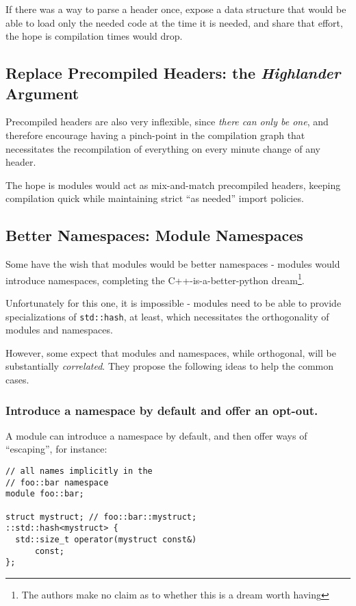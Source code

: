 \documentclass[reqno]{article}
\begin{document}
If there was a way to parse a header once, expose a data structure that would be
able to load only the needed code at the time it is needed, and share that
effort, the hope is compilation times would drop.


\subsection{Replace Precompiled Headers: the \emph{Highlander} Argument}

Precompiled headers are also very inflexible, since \emph{there can only be
one}, and therefore encourage having a pinch-point in the compilation graph that
necessitates the recompilation of everything on every minute change of any
header.

The hope is modules would act as mix-and-match precompiled headers, keeping
compilation quick while maintaining strict “as needed” import policies.


\subsection{Better Namespaces: Module Namespaces}

Some have the wish that modules would be better namespaces - modules would
introduce namespaces, completing the C++-is-a-better-python dream\footnote{The
authors make no claim as to whether this is a dream worth having}.

Unfortunately for this one, it is impossible - modules need to be able to
provide specializations of \texttt{std::hash}, at least, which necessitates the
orthogonality of modules and namespaces.

However, some expect that modules and namespaces, while orthogonal, will be
substantially \emph{correlated}. They propose the following ideas to help the
common cases.


\subsubsection{Introduce a namespace by default and offer an opt-out.}

A module can introduce a namespace by default, and then offer ways of
“escaping”, for instance:

\begin{verbatim}
// all names implicitly in the
// foo::bar namespace
module foo::bar;

struct mystruct; // foo::bar::mystruct;
::std::hash<mystruct> {
  std::size_t operator(mystruct const&)
      const;
};
\end{verbatim}
\end{document}
